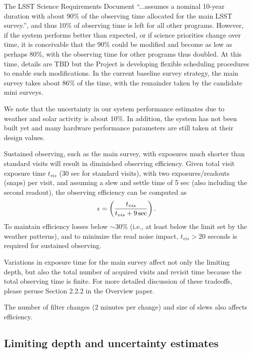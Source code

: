\documentclass[DM,toc,usenatbib]{lsstdoc}
\begin{document}
The LSST Science Requirements Document  ``...assumes a nominal 10-year duration with about 90\% 
of the observing time allocated for the main LSST survey.'', and thus 10\% of observing time is left for 
all other programs. However, if the system performs better than expected, or if science priorities 
change over time, it is conceivable that the 90\% could be modified and become as low as perhaps 80\%, 
with the observing time for other programs thus doubled. At this time, details are TBD but the Project
is developing flexible scheduling procedures to enable such modifications. In the current baseline
survey strategy, the main survey takes about 86\% of the time, with the remainder taken by the candidate mini surveys. 

We note that the uncertainty in our system performance estimates due to weather and solar activity is about 10\%.
In addition, the system has not been built yet and many hardware performance parameters are
still taken at their design values.  

Sustained observing, such as the main survey, with exposures much shorter than standard visits will result
in diminished observing efficiency. Given total visit exposure time $t_{vis}$ (30 sec for standard
visits), with two exposures/readouts (snaps) per visit, and assuming a slew and settle time of 5 sec 
(also including the second readout), the observing efficiency can be computed as 
\begin{equation}
     \epsilon = \left( {t_{vis} \over t_{vis} + 9 \, \mathrm{sec}}\right).
\end{equation}
To maintain efficiency losses below $\sim$30\% (i.e., at least below the limit set by the weather patterns),
and to minimize the read noise impact, $t_{vis} > 20$ seconds is required for sustained observing. 

Variations in exposure time for the main survey affect not only the limiting depth, but also the total number of 
acquired visits and revisit time because the total observing time is finite. For more detailed 
discussion of these tradeoffs, please peruse Section 2.2.2 in the Overview paper. 

The number of filter changes (2 minutes per change) and size of slews also affects efficiency. 


\subsection{Limiting depth and uncertainty estimates}  
\end{document}
